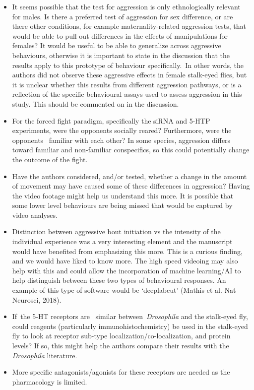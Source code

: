 \documentclass[10pt]{article}
\providecommand{\tightlist}{\setlength{\itemsep}{0pt}\setlength{\parskip}{0pt}}%
\begin{document}
\begin{itemize}
\tightlist
\item
  It seems possible that the test for aggression is only ethnologically
  relevant for males. Is there a preferred test of aggression for sex
  difference, or are there other conditions, for example
  maternality-related aggression tests, that would be able to pull out
  differences in the effects of manipulations for females? It would be
  useful to be able to generalize across aggressive behaviours,
  otherwise it is important to state in the discussion that the results
  apply to this prototype of behaviour specifically.~In other words, the
  authors did not observe these aggressive effects in female stalk-eyed
  flies, but it is unclear whether this results from different
  aggression pathways, or is a reflection of the specific behavioural
  assays used to assess aggression in this study. This should be
  commented on in the discussion.~
\item
  For the forced fight paradigm, specifically the siRNA and 5-HTP
  experiments, were the opponents socially reared? Furthermore, were the
  opponents~ familiar with each other? In some species, aggression
  differs toward familiar and non-familiar conspecifics, so this could
  potentially change the outcome of the fight.
\item
  Have the authors considered, and/or tested, whether a change in the
  amount of movement may have caused some of these differences in
  aggression? Having the video footage might help us understand this
  more. It is possible that some lower level behaviours are being missed
  that would be captured by video analyses.
\item
  Distinction between aggressive bout initiation vs the intensity of the
  individual experience was a very interesting element and the
  manuscript would have benefited from emphasizing this more. This is a
  curious finding, and we would have liked to know more. The high speed
  videoing may also help with this and could allow the incorporation of
  machine learning/AI to help distinguish between these two types of
  behavioural responses. An example of this type of software would be
  `deeplabcut' (Mathis et al. Nat Neurosci, 2018).
\item
  If~the 5-HT receptors are~ similar between~\emph{Drosophila} and the
  stalk-eyed fly, could reagents (particularly immunohistochemistry) be
  used in the stalk-eyed fly to look at receptor sub-type
  localization/co-localization, and protein levels? If so, this might
  help the authors compare their results with the \emph{Drosophila}
  literature.
\item
  More specific antagonists/agonists for these receptors are needed as
  the pharmacology is limited.
\end{itemize}
\end{document}
